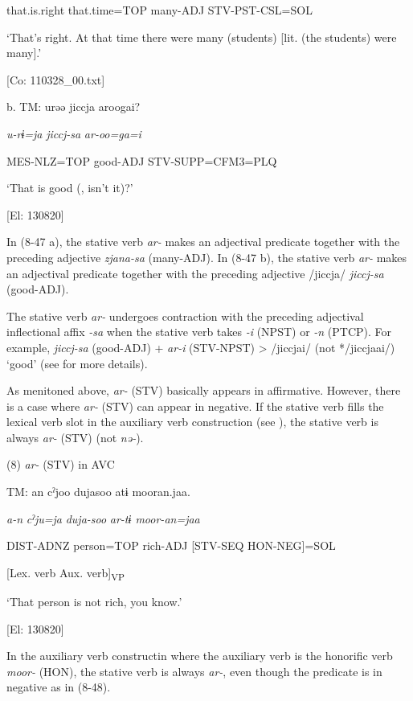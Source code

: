       that.is.right  that.time=TOP  many-ADJ  STV-PST-CSL=SOL

      ‘That’s right. At that time there were many (students) [lit. (the students) were many].’

      [Co: 110328\_00.txt]

  b.  TM:  urəə  jiccja  aroogai?

      \textit{u-rɨ=ja}  \textit{jiccj-sa}  \textit{ar{}-oo=ga=i}

      MES-NLZ=TOP  good-ADJ  STV-SUPP=CFM3=PLQ

      ‘That is good (, isn’t it)?’

      [El: 130820]

In (8-47 a), the stative verb \textit{ar-} makes an adjectival predicate together with the preceding adjective \textit{zjana-sa} (many-ADJ). In (8-47 b), the stative verb \textit{ar-} makes an adjectival predicate together with the preceding adjective /jiccja/ \textit{jiccj-sa} (good-ADJ).

  The stative verb \textit{ar-} undergoes contraction with the preceding adjectival inflectional affix \textit{{}-sa} when the stative verb takes \textit{{}-i} (NPST) or \textit{{}-n} (PTCP). For example, \textit{jiccj-sa} (good-ADJ) + \textit{ar-i} (STV-NPST) > /jiccjai/ (not */jiccjaai/) ‘good’ (see  for more details).

As menitoned above, \textit{ar-} (STV) basically appears in affirmative. However, there is a case where \textit{ar-} (STV) can appear in negative. If the stative verb fills the lexical verb slot in the auxiliary verb construction (see ), the stative verb is always \textit{ar-} (STV) (not \textit{nə-}).

(8)  \textit{ar-} (STV) in AVC

  TM:  an  cˀjoo  dujasoo  atɨ  mooran.jaa.

    \textit{a-n}  \textit{cˀju=ja}  \textit{duja-soo}  \textit{ar{}-tɨ  moor-an=jaa}

    DIST-ADNZ  person=TOP  rich-ADJ  [STV-SEQ  HON-NEG]=SOL

          [Lex. verb  Aux. verb]\textsubscript{VP}

    ‘That person is not rich, you know.’

    [El: 130820]

In the auxiliary verb constructin where the auxiliary verb is the honorific verb \textit{moor-} (HON), the stative verb is always \textit{ar-}, even though the predicate is in negative as in (8-48).

